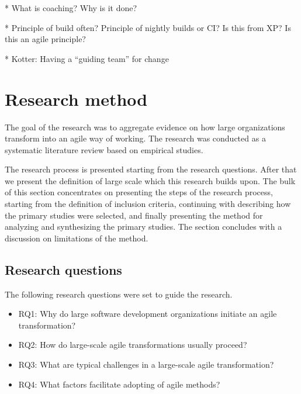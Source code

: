 * What is coaching? Why is it done?

* Principle of build often? Principle of nightly builds or CI? Is this from XP?
  Is this an agile principle?

* Kotter: Having a ``guiding team'' for change


\clearpage

\section{Research method}
\label{sec:method}

The goal of the research was to aggregate evidence on how large organizations
transform into an agile way of working. The research was conducted as a
systematic literature review based on empirical studies.

The research process is presented starting from the research questions. After
that we present the definition of large scale which this research builds upon.
The bulk of this section concentrates on presenting the steps of the research
process, starting from the definition of inclusion criteria, continuing with
describing how the primary studies were selected, and finally presenting the
method for analyzing and synthesizing the primary studies. The section concludes
with a discussion on limitations of the method.


\subsection{Research questions}

The following research questions were set to guide the research.

\begin{itemize}

\item
RQ1: Why do large software development organizations initiate an agile
transformation?

\item
RQ2: How do large-scale agile transformations usually proceed?

\item
RQ3: What are typical challenges in a large-scale agile transformation?

\item
RQ4: What factors facilitate adopting of agile methods?

\end{itemize}


